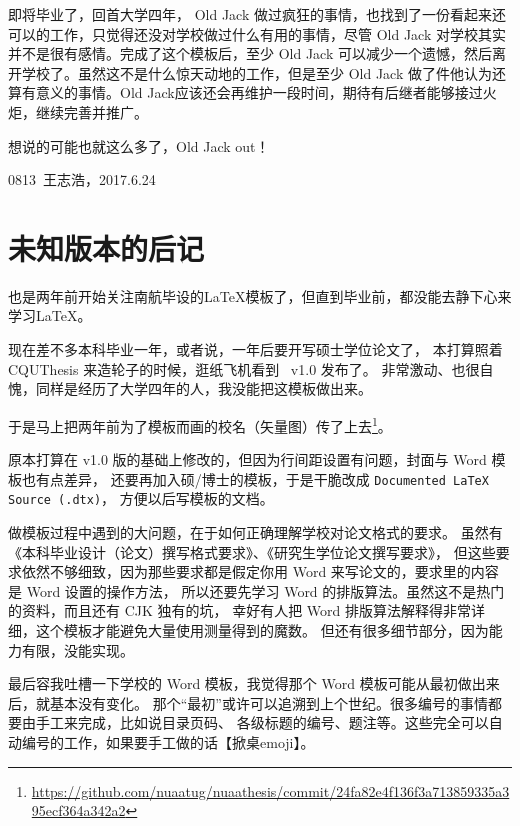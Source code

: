 即将毕业了，回首大学四年， Old Jack 做过疯狂的事情，也找到了一份看起来还可以的工作，只觉得还没对学校做过什么有用的事情，尽管 Old Jack 对学校其实并不是很有感情。完成了这个模板后，至少 Old Jack 可以减少一个遗憾，然后离开学校了。虽然这不是什么惊天动地的工作，但是至少 Old Jack 做了件他认为还算有意义的事情。Old Jack应该还会再维护\nuaathesis 一段时间，期待有后继者能够接过火炬，继续完善并推广\nuaathesis 。

想说的可能也就这么多了，Old Jack out！

\hfill 0813~王志浩，2017.6.24

\section{未知版本的后记}

也是两年前开始关注南航毕设的\LaTeX 模板了，但直到毕业前，都没能去静下心来学习\LaTeX。

现在差不多本科毕业一年，或者说，一年后要开写硕士学位论文了，
本打算照着 CQUThesis 来造轮子的时候，逛纸飞机看到 \nuaathesis~v1.0 发布了。
非常激动、也很自愧，同样是经历了大学四年的人，我没能把这模板做出来。

于是马上把两年前为了模板而画的校名（矢量图）传了上去\footnote{\url{https://github.com/nuaatug/nuaathesis/commit/24fa82e4f136f3a713859335a395ecf364a342a2}}。

原本打算在 v1.0 版的基础上修改的，但因为行间距设置有问题，封面与 Word 模板也有点差异，
还要再加入硕/博士的模板，于是干脆改成 \texttt{Documented LaTeX Source (.dtx)}，
方便以后写模板的文档。

做模板过程中遇到的大问题，在于如何正确理解学校对论文格式的要求。
虽然有《本科毕业设计（论文）撰写格式要求》、《研究生学位论文撰写要求》，
但这些要求依然不够细致，因为那些要求都是假定你用 Word 来写论文的，要求里的内容是 Word 设置的操作方法，
所以还要先学习 Word 的排版算法。虽然这不是热门的资料，而且还有 CJK 独有的坑，
幸好有人把 Word 排版算法解释得非常详细，这个模板才能避免大量使用测量得到的魔数。
但还有很多细节部分，因为能力有限，没能实现。

最后容我吐槽一下学校的 Word 模板，我觉得那个 Word 模板可能从最初做出来后，就基本没有变化。
那个“最初”或许可以追溯到上个世纪。很多编号的事情都要由手工来完成，比如说目录页码、
各级标题的编号、题注等。这些完全可以自动编号的工作，如果要手工做的话【掀桌emoji】。
